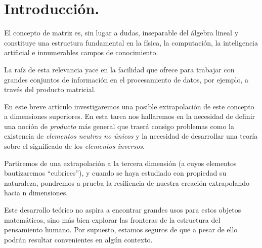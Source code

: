 \section{Introducción.}

El concepto de matriz es, sin lugar a dudas, inseparable del álgebra lineal y constituye una estructura fundamental en la física, la computación, la inteligencia artificial e innumerables campos de conocimiento.

La raíz de esta relevancia yace en la facilidad que ofrece para trabajar con grandes conjuntos de información en el procesamiento de datos, por ejemplo, a través del producto matricial.

En este breve artículo investigaremos una posible extrapolación de este concepto a dimensiones superiores. En esta tarea nos hallaremos en la necesidad de definir una noción de \textit{producto} más general que traerá consigo problemas como la existencia de \textit{elementos neutros no únicos} y la necesidad de desarrollar una teoría sobre el significado de los \textit{elementos inversos}.

Partiremos de una extrapolación a la tercera dimensión (a cuyos elementos bautizaremos ``cubrices''), y cuando se haya estudiado con propiedad su naturaleza, pondremos a prueba la resiliencia de nuestra creación extrapolando hacia n dimensiones.

Este desarrollo teórico no aspira a encontrar grandes usos para estos objetos matemáticos, sino más bien explorar las fronteras de la estructura del pensamiento humano. Por supuesto, estamos seguros de que a pesar de ello podrán resultar convenientes en algún contexto.
